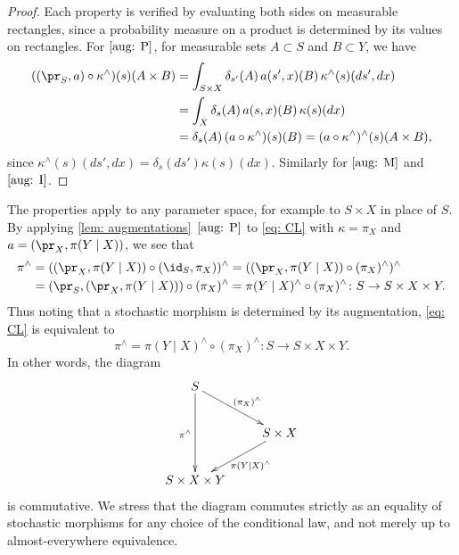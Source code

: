 \documentclass[12pt,reqno]{amsart}%
\theoremstyle{plain}
\theoremstyle{definition}
\begin{document}
\begin{proof}
	Each property is verified by evaluating both sides on measurable rectangles, since a probability measure
	on a product is determined by its values on rectangles.
	For $\ref{aug: P}$, for measurable sets $A\subset S$ and $B\subset Y$, we have
	\begin{align*}
		((\pr_S,a)\circ\kappa^\wedge)(s)(A\times B)
		&=\int_{S\times X}\delta_{s'}(A)\,a(s',x)(B)\,\kappa^\wedge(s)(ds',dx)\\
		&=\int_{X}\delta_{s}(A)\,a(s,x)(B)\,\kappa(s)(dx)\\
		&=\delta_s(A)\,(a\circ\kappa^\wedge)(s)(B)
		=(a\circ\kappa^\wedge)^\wedge(s)(A\times B),
	\end{align*}
	since $\kappa^\wedge(s)(ds',dx)=\delta_s(ds')\kappa(s)(dx)$.
	Similarly for $\ref{aug: M}$ and $\ref{aug: I}$.
\end{proof}

The properties apply to any parameter space, for example to $S\times X$ in place of $S$.
By applying \cref{lem: augmentations}~$\ref{aug: P}$ to \eqref{eq: CL} with $\kappa=\pi_X$ and $a=(\pr_X,\pi(Y\mid X))$, we see that
\begin{align*}
	\pi^\wedge&= ((\pr_X, \pi(Y\mid X))\circ (\id_S,\pi_X))^\wedge
	=((\pr_X, \pi(Y\mid X))\circ (\pi_X)^\wedge)^\wedge\\
	&=(\pr_S,(\pr_X, \pi(Y\mid X)))\circ(\pi_X)^\wedge
	=\pi(Y\mid X)^\wedge\circ(\pi_X)^\wedge\colon S\rightarrow S\times X\times Y.
\end{align*}
Thus noting that a stochastic morphism is determined by its augmentation, \eqref{eq: CL} is equivalent to
\[
	\pi^\wedge=\pi(Y\mid X)^\wedge\circ(\pi_X)^\wedge\colon S\rightarrow S\times X\times Y.
\]
In other words, the diagram
\begin{equation}\label{eq: CL aug}
	\xymatrix{
		S \ar[dd]_{\pi^\wedge} \ar[dr]^{(\pi_X)^\wedge} &  \\
		&  S\times X \ar[dl]^{\pi(Y\mid X)^\wedge}\\
		S\times X\times Y&
	}
\end{equation}
is commutative.
We stress that the diagram commutes strictly as an equality of stochastic morphisms
for any choice of the conditional law, and not merely up to almost-everywhere equivalence.
\end{document}
